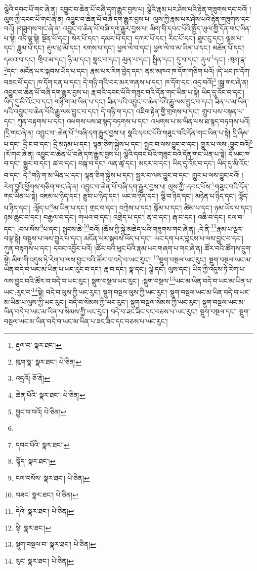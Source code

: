 ལྕེའི་དབང་པོ་གང་ཞེ་ན། འབྱུང་བ་ཆེན་པོ་བཞི་དག་རྒྱུར་བྱས་པ། ལྕེའི་རྣམ་པར་ཤེས་པའི་རྟེན་གཟུགས་དང་བའོ། །ལུས་ཀྱི་དབང་པོ་གང་ཞེ་ན། འབྱུང་བ་ཆེན་པོ་བཞི་དག་རྒྱུར་བྱས་པ། ལུས་ཀྱི་རྣམ་པར་ཤེས་པའི་རྟེན་གཟུགས་དང་བའོ། །གཟུགས་གང་ཞེ་ན། འབྱུང་བ་ཆེན་པོ་བཞི་དག་རྒྱུར་བྱས་པ། མིག་གི་དབང་པོའི་སྤྱོད་ཡུལ་གྱི་དོན་གང་ཡིན་པ་སྟེ། འདི་ལྟ་སྟེ། སྔོན་པོ་དང་། སེར་པོ་དང་། དམར་པོ་དང་། དཀར་པོ་དང་། རིང་པོ་དང་། ཐུང་ངུ་དང་། ལྷམ་པ་དང་། ཟླུམ་པོ་དང་། རྡུལ་ཕྲ་མོ་དང་། རགས་པ་དང་། ཕྱལ་ལེ་བ་དང་། ཕྱལ་ལེ་བ་མ་ཡིན་པ་དང་། མཐོན་པོ་དང་། དམའ་བ་དང་། གྲིབ་མ་དང་། ཉི་མ་དང་། སྣང་བ་དང་། མུན་པ་དང་། སྤྲིན་དང་། དུ་བ་དང་། རྡུལ་\footnote{རྡུལ་བ་  སྣར་ཐང་། }དང་། :ཁུག་རྣ་\footnote{ཁུག་སྣ་  སྣར་ཐང་།  པེ་ཅིན། }དང་། མངོན་པར་སྐབས་ཡོད་པ་དང་། རྣམ་པར་རིག་བྱེད་དང་། ནམ་མཁའ་ཁ་དོག་གཅིག་པའོ། །དེ་ཡང་ཁ་དོག་བཟང་པོ་དང་། ཁ་དོག་ངན་པ་དང་། དེ་གཉི་གའི་བར་མར་གནས་པ་དང་། ཁ་དོག་དང་:འདྲ་བའོ།\footnote{འདྲའོ།  ཅོ་ནེ། } །སྒྲ་གང་ཞེ་ན། འབྱུང་བ་ཆེན་པོ་བཞི་དག་རྒྱུར་བྱས་པ། རྣ་བའི་དབང་པོའི་གཟུང་བའི་དོན་གང་ཡིན་པ་སྟེ། ཡིད་དུ་འོང་བ་དང་། ཡིད་དུ་མི་འོང་བ་དང་། གཉི་ག་མ་ཡིན་པ་དང་། ཟིན་པའི་འབྱུང་བ་ཆེན་པོའི་རྒྱུ་ལས་བྱུང་བ་དང་། ཟིན་པ་མ་ཡིན་པའི་འབྱུང་བ་ཆེན་པོའི་རྒྱུ་ལས་བྱུང་བ་དང་། དེ་གཉི་ག་དང་། འཇིག་རྟེན་གྱི་གྲགས་པ་དང་། གྲུབ་པས་བསྟན་པ་དང་། ཀུན་བརྟགས་པ་དང་། འཕགས་པས་ཐ་སྙད་བཏགས་པ་དང་། འཕགས་པ་མ་ཡིན་པས་ཐ་སྙད་བཏགས་པའོ། །དྲི་གང་ཞེ་ན། འབྱུང་བ་:ཆེན་པོ་\footnote{ཆེན་པོའི་  སྣར་ཐང་།  པེ་ཅིན། }བཞི་དག་རྒྱུར་བྱས་པ། སྣའི་དབང་པོའི་གཟུང་བའི་དོན་གང་ཡིན་པ་སྟེ། དྲི་ཞིམ་པ་དང་། དྲི་ང་བ་དང་། དྲི་མཉམ་པ་དང་། ལྷན་ཅིག་སྐྱེས་པ་དང་། སྦྱར་བ་ལས་བྱུང་བ་དང་། གྱུར་པ་ལས་:བྱུང་བའོ།\footnote{བྱུང་བ་བའོ།  པེ་ཅིན། } །རོ་གང་ཞེ་ན། འབྱུང་བ་ཆེན་པོ་བཞི་དག་རྒྱུར་བྱས་པ། ལྕེའི་དབང་པོའི་གཟུང་བའི་དོན་གང་ཡིན་པ་སྟེ། དེ་ཡང་ཁ་བ་དང་། སྐྱུར་བ་དང་། ཚ་བ་དང་། བསྐ་བ་དང་། ལན་ཚྭ་དང་། མངར་བ་དང་། ཡིད་དུ་འོང་བ་དང་། ཡིད་དུ་མི་འོང་བ་དང་། དེ་\footnote{}གཉི་ག་མ་ཡིན་པ་དང་། ལྷན་ཅིག་སྐྱེས་པ་དང་། སྦྱར་བ་ལས་བྱུང་བ་དང་། གྱུར་པ་ལས་བྱུང་བའོ། །རེག་བྱའི་ཕྱོགས་གཅིག་གང་ཞེ་ན། འབྱུང་བ་ཆེན་པོ་བཞི་དག་རྒྱུར་བྱས་པ། ལུས་ཀྱི་:དབང་པོས་\footnote{དབང་པོའི་  སྣར་ཐང་། }གཟུང་བའི་དོན་གང་ཡིན་པ་སྟེ། འཇམ་པ་ཉིད་དང་། རྩུབ་པ་ཉིད་དང་། ཡང་བ་ཉིད་དང་། ལྕི་བ་ཉིད་དང་། མཉེན་པ་ཉིད་དང་། ལྷོད་པ་ཉིད་དང་། :ལྷོད་པ་\footnote{ལྷོད་  སྣར་ཐང་། }མ་ཡིན་པ་དང་། གྲང་བ་དང་། བཀྲེས་པ་དང་། སྐོམ་པ་དང་། ཚིམ་པ་དང་། ཉམ་ཡོད་པ་དང་། ཉམ་ཆུང་བ་དང་། བརྒྱལ་བ་དང་། གཡའ་བ་དང་། འགྲེད་པ་དང་། ན་བ་དང་། རྒ་བ་དང་། འཆི་བ་དང་། ངལ་བ་དང་། :ངལ་སོས་\footnote{ངལ་བསོས་  སྣར་ཐང་།  པེ་ཅིན། }པ་དང་། སྤུངས་ཆེ་\footnote{བཟང་  སྣར་ཐང་།  པེ་ཅིན། }བའོ། །ཆོས་ཀྱི་སྐྱེ་མཆེད་པའི་གཟུགས་གང་ཞེ་ན། :དེ་ནི་\footnote{དེའི་  སྣར་ཐང་།  པེ་ཅིན། }རྣམ་པ་ལྔར་བལྟ་སྟེ། བསྡུས་པ་ལས་གྱུར་པ་དང་། མངོན་པར་སྐབས་ཡོད་པ་དང་། ཡང་དག་པར་བླངས་པ་ལས་བྱུང་བ་དང་། ཀུན་བརྟགས་པ་དང་། དབང་འབྱོར་པའོ། །ཚོར་བའི་ཕུང་པོའི་རྣམ་པར་གཞག་པ་གང་ཞེ་ན། ཚོར་བའི་ཚོགས་དྲུག་སྟེ། མིག་གི་འདུས་ཏེ་རེག་པ་ལས་བྱུང་བའི་ཚོར་བ་བདེ་བ་ཡང་རུང་། \footnote{སྟེ་  སྣར་ཐང་། }སྡུག་བསྔལ་ཡང་རུང་། སྡུག་བསྔལ་ཡང་མ་ཡིན་བདེ་བ་ཡང་མ་ཡིན་པ་ཡང་རུང་བ་དང་། རྣ་བ་དང་། སྣ་དང་། ལྕེ་དང་། ལུས་དང་། ཡིད་ཀྱི་འདུས་ཏེ་རེག་པ་ལས་བྱུང་བའི་ཚོར་བ་བདེ་བ་ཡང་རུང་། སྡུག་བསྔལ་ཡང་རུང་། :སྡུག་བསྔལ་\footnote{སྡུག་བསྔལ་བ་  སྣར་ཐང་།  པེ་ཅིན། }ཡང་མ་ཡིན་བདེ་བ་ཡང་མ་ཡིན་པ་ཡང་:རུང་བ་\footnote{རུང་  སྣར་ཐང་།  པེ་ཅིན། }སྟེ། བདེ་བ་ལུས་ཀྱི་ཡང་རུང་། སྡུག་བསྔལ་ལུས་ཀྱི་ཡང་རུང་། སྡུག་བསྔལ་ཡང་མ་ཡིན་བདེ་བ་ཡང་མ་ཡིན་པ་ལུས་ཀྱི་ཡང་རུང་། བདེ་བ་སེམས་ཀྱི་ཡང་རུང་། སྡུག་བསྔལ་སེམས་ཀྱི་ཡང་རུང་། སྡུག་བསྔལ་ཡང་མ་ཡིན་བདེ་བ་ཡང་མ་ཡིན་པ་སེམས་ཀྱི་ཡང་རུང་། བདེ་བ་ཟང་ཟིང་དང་བཅས་པ་ཡང་རུང་། སྡུག་བསྔལ་དང་། སྡུག་བསྔལ་ཡང་མ་ཡིན་བདེ་བ་ཡང་མ་ཡིན་པ་ཟང་ཟིང་དང་བཅས་པ་ཡང་རུང་། 